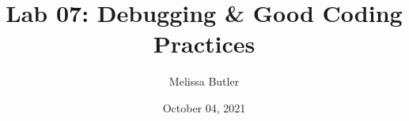 \newcommand{\course}{MATH 3341}
\title{Lab 07: Debugging \& Good Coding Practices}
\author{Melissa Butler}
\date{October 04, 2021}
